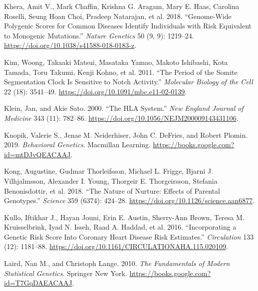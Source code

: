 \documentclass[
]{book}
\newlength{\cslhangindent}
\newlength{\cslentryspacingunit} %
\newenvironment{CSLReferences}[2] %
 {%
  \setlength{\parindent}{0pt}
  \ifodd #1
  \let\oldpar\par
  \def\par{\hangindent=\cslhangindent\oldpar}
  \fi
  \setlength{\parskip}{#2\cslentryspacingunit}
 }%
 {}
\begin{document}
\begin{CSLReferences}{1}{0}
\leavevmode{}%
Khera, Amit V., Mark Chaffin, Krishna G. Aragam, Mary E. Haas, Carolina Roselli, Seung Hoan Choi, Pradeep Natarajan, et al. 2018. {``Genome-Wide Polygenic Scores for Common Diseases Identify Individuals with Risk Equivalent to Monogenic Mutations.''} \emph{Nature Genetics} 50 (9, 9): 1219--24. \url{https://doi.org/10.1038/s41588-018-0183-z}.

\leavevmode{}%
Kim, Woong, Takaaki Matsui, Masataka Yamao, Makoto Ishibashi, Kota Tamada, Toru Takumi, Kenji Kohno, et al. 2011. {``The Period of the Somite Segmentation Clock Is Sensitive to {Notch} Activity.''} \emph{Molecular Biology of the Cell} 22 (18): 3541--49. \url{https://doi.org/10.1091/mbc.e11-02-0139}.

\leavevmode{}%
Klein, Jan, and Akie Sato. 2000. {``The {HLA System}.''} \emph{New England Journal of Medicine} 343 (11): 782--86. \url{https://doi.org/10.1056/NEJM200009143431106}.

\leavevmode{}%
Knopik, Valerie S., Jenae M. Neiderhiser, John C. DeFries, and Robert Plomin. 2019. \emph{Behavioral {Genetics}}. {Macmillan Learning}. \url{https://books.google.com?id=mtDJvQEACAAJ}.

\leavevmode{}%
Kong, Augustine, Gudmar Thorleifsson, Michael L. Frigge, Bjarni J. Vilhjalmsson, Alexander I. Young, Thorgeir E. Thorgeirsson, Stefania Benonisdottir, et al. 2018. {``The Nature of Nurture: {Effects} of Parental Genotypes.''} \emph{Science} 359 (6374): 424--28. \url{https://doi.org/10.1126/science.aan6877}.

\leavevmode{}%
Kullo, Iftikhar J., Hayan Jouni, Erin E. Austin, Sherry-Ann Brown, Teresa M. Kruisselbrink, Iyad N. Isseh, Raad A. Haddad, et al. 2016. {``Incorporating a {Genetic Risk Score Into Coronary Heart Disease Risk Estimates}.''} \emph{Circulation} 133 (12): 1181--88. \url{https://doi.org/10.1161/CIRCULATIONAHA.115.020109}.

\leavevmode{}%
Laird, Nan M., and Christoph Lange. 2010. \emph{The {Fundamentals} of {Modern Statistical Genetics}}. {Springer New York}. \url{https://books.google.com?id=T7GqDAEACAAJ}.


\end{CSLReferences}
\end{document}
